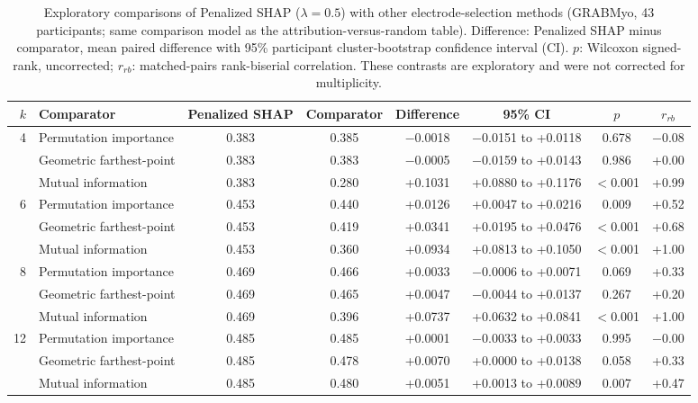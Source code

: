 \begin{table}[htbp]
\centering
\small
\caption{Exploratory comparisons of Penalized SHAP ($\lambda = 0.5$) with other electrode-selection methods (GRABMyo, 43 participants; same comparison model as the attribution-versus-random table). Difference: Penalized SHAP minus comparator, mean paired difference with 95\% participant cluster-bootstrap confidence interval (CI). $p$: Wilcoxon signed-rank, uncorrected; $r_{rb}$: matched-pairs rank-biserial correlation. These contrasts are exploratory and were not corrected for multiplicity.}
\label{tab:selection_explor}
\setlength{\tabcolsep}{4pt}
\begin{adjustbox}{max width=\textwidth}
\begin{tabular}{rlcccccc}
\toprule
$k$ & Comparator & Penalized SHAP & Comparator & Difference & 95\% CI & $p$ & $r_{rb}$ \\
\midrule
4 & Permutation importance & 0.383 & 0.385 & $-$0.0018 & $-$0.0151 to +0.0118 & 0.678 & $-$0.08 \\
 & Geometric farthest-point & 0.383 & 0.383 & $-$0.0005 & $-$0.0159 to +0.0143 & 0.986 & +0.00 \\
 & Mutual information & 0.383 & 0.280 & +0.1031 & +0.0880 to +0.1176 & $<$0.001 & +0.99 \\
\midrule 6 & Permutation importance & 0.453 & 0.440 & +0.0126 & +0.0047 to +0.0216 & 0.009 & +0.52 \\
 & Geometric farthest-point & 0.453 & 0.419 & +0.0341 & +0.0195 to +0.0476 & $<$0.001 & +0.68 \\
 & Mutual information & 0.453 & 0.360 & +0.0934 & +0.0813 to +0.1050 & $<$0.001 & +1.00 \\
\midrule 8 & Permutation importance & 0.469 & 0.466 & +0.0033 & $-$0.0006 to +0.0071 & 0.069 & +0.33 \\
 & Geometric farthest-point & 0.469 & 0.465 & +0.0047 & $-$0.0044 to +0.0137 & 0.267 & +0.20 \\
 & Mutual information & 0.469 & 0.396 & +0.0737 & +0.0632 to +0.0841 & $<$0.001 & +1.00 \\
\midrule 12 & Permutation importance & 0.485 & 0.485 & +0.0001 & $-$0.0033 to +0.0033 & 0.995 & $-$0.00 \\
 & Geometric farthest-point & 0.485 & 0.478 & +0.0070 & +0.0000 to +0.0138 & 0.058 & +0.33 \\
 & Mutual information & 0.485 & 0.480 & +0.0051 & +0.0013 to +0.0089 & 0.007 & +0.47 \\
\bottomrule
\end{tabular}
\end{adjustbox}
\end{table}
